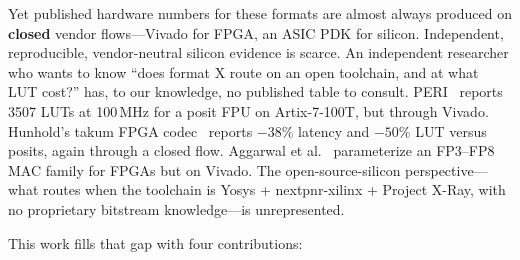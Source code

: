 \documentclass[11pt]{article}
\begin{document}
Yet published hardware numbers for these formats are almost always produced on
\textbf{closed} vendor flows---Vivado for FPGA, an ASIC PDK for silicon.
Independent, reproducible, vendor-neutral silicon evidence is scarce. An
independent researcher who wants to know ``does format X route on an open
toolchain, and at what LUT cost?'' has, to our knowledge, no published table to
consult. PERI~\cite{tiwari2019peri} reports 3507 LUTs at 100\,MHz for a posit
FPU on Artix-7-100T, but through Vivado. Hunhold's takum FPGA
codec~\cite{hunhold2024takumcodec} reports $-38\%$ latency and $-50\%$ LUT
versus posits, again through a closed flow. Aggarwal et
al.~\cite{aggarwal2024minifloat} parameterize an FP3--FP8 MAC family for FPGAs
but on Vivado. The open-source-silicon perspective---what routes when the
toolchain is Yosys + nextpnr-xilinx + Project X-Ray, with no proprietary
bitstream knowledge---is unrepresented.

This work fills that gap with four contributions:
\end{document}
